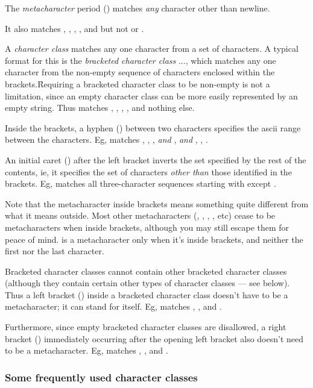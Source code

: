 {The {\em metacharacter} period () matches
{\em any} character other than newline.


\n It also matches , , , ,
and  but not  or .

A {\em character class} matches any one character from
a set of characters.  A typical format for this
is the {\em bracketed character class} \p{[}...\p{]}, 
which matches any one character from the non-empty sequence
of characters enclosed within the brackets.\f{Requiring
a bracketed character class to be non-empty is not a limitation,
since an
empty character class
can be more easily represented by an empty string.}
Thus  matches , , ,
,  and nothing else.

Inside the brackets, a hyphen (\p{-}) between two
characters specifies the ascii range between the characters.
Eg,  matches , , , {\em and}
, {\em and} , , .

An initial caret (\p{^}) after the left bracket inverts
the set specified by the rest of the contents, ie, it
specifies the set of characters {\em other than} those
identified in the brackets.  Eg,  matches
all three-character sequences starting with 
except .

Note that the metacharacter \p{^} inside brackets means
something quite different from what it means outside.
Most other metacharacters (, \p{*}, \p{+}, ,
etc) cease to be metacharacters when inside brackets,
although you may still escape them for peace of
mind.  \p{-} is a metacharacter only when it's
inside brackets, and neither the first nor the last character. 

Bracketed character classes cannot contain other
bracketed character classes (although they contain
certain other types of character classes --- see
below).  Thus a left bracket (\p{[})
inside a bracketed character class doesn't have to be a
metacharacter; it can stand for itself.  Eg,
\q{"[a[b]"} matches , \p{[}, and .   

Furthermore, since empty bracketed character classes
are disallowed, a right bracket (\p{]}) immediately occurring
after the opening left bracket
also doesn't need to be a metacharacter.  Eg,
\q{"[]ab]"} matches \p{]}, , and .

\subsubsection{Some frequently used character
classes}

}
